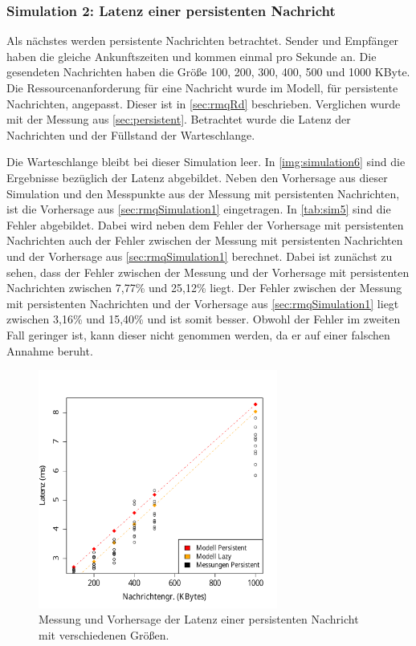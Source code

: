 \subsubsection{Simulation 2: Latenz einer persistenten Nachricht}
\label{sec:rmqSimulationPersistent}
Als nächstes werden persistente Nachrichten betrachtet. Sender und Empfänger haben die gleiche Ankunftszeiten und kommen einmal pro Sekunde an. Die gesendeten Nachrichten haben die Größe 100, 200, 300, 400, 500 und 1000 KByte. Die Ressourcenanforderung für eine Nachricht wurde im Modell, für persistente Nachrichten, angepasst. Dieser ist in \autoref{sec:rmqRd} beschrieben. Verglichen wurde mit der Messung aus \autoref{sec:persistent}. Betrachtet wurde die Latenz der Nachrichten und der Füllstand der Warteschlange. \par
Die Warteschlange bleibt bei dieser Simulation leer. In \autoref{img:simulation6} sind die Ergebnisse bezüglich der Latenz abgebildet. Neben den Vorhersage aus dieser Simulation und den Messpunkte aus der Messung mit persistenten Nachrichten, ist die Vorhersage aus \autoref{sec:rmqSimulation1} eingetragen. In \autoref{tab:sim5} sind die Fehler abgebildet. Dabei wird neben dem Fehler der Vorhersage mit persistenten Nachrichten auch der Fehler zwischen der Messung mit persistenten Nachrichten und der Vorhersage aus \autoref{sec:rmqSimulation1} berechnet. Dabei ist zunächst zu sehen, dass der Fehler zwischen der Messung und der Vorhersage mit persistenten Nachrichten zwischen 7,77\% und 25,12\% liegt. Der Fehler zwischen der Messung mit persistenten Nachrichten und der Vorhersage aus \autoref{sec:rmqSimulation1} liegt zwischen 3,16\% und 15,40\% und ist somit besser. Obwohl der Fehler im zweiten Fall geringer ist, kann dieser nicht genommen werden, da er auf einer falschen Annahme beruht.
\begin{figure}
\center
  \includegraphics[width=0.7\textwidth]{images/modelSimulationResults/simulation7.pdf}
  \caption{Messung und Vorhersage der Latenz einer persistenten Nachricht mit verschiedenen Größen.}
  \label{img:simulation6}
\end{figure}

